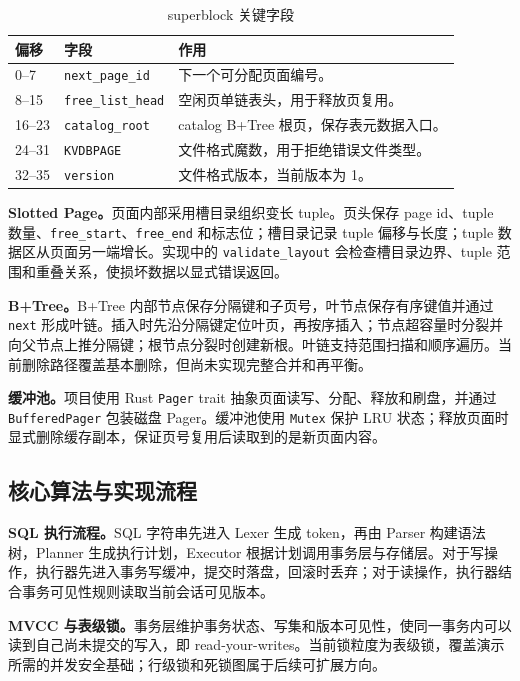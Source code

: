 \documentclass[UTF8,a4paper,12pt]{ctexart}
\newcommand{\code}[1]{\texttt{#1}}
\begin{document}
\begin{table}[H]
\centering
\caption{superblock 关键字段}
\begin{tabularx}{\textwidth}{p{2.5cm}p{3.4cm}X}
\toprule
偏移 & 字段 & 作用\\
\midrule
0--7 & \code{next\_page\_id} & 下一个可分配页面编号。\\
8--15 & \code{free\_list\_head} & 空闲页单链表头，用于释放页复用。\\
16--23 & \code{catalog\_root} & catalog B+Tree 根页，保存表元数据入口。\\
24--31 & \code{KVDBPAGE} & 文件格式魔数，用于拒绝错误文件类型。\\
32--35 & \code{version} & 文件格式版本，当前版本为 1。\\
\bottomrule
\end{tabularx}
\end{table}

\textbf{Slotted Page。}页面内部采用槽目录组织变长 tuple。页头保存 page id、tuple 数量、\code{free\_start}、\code{free\_end} 和标志位；槽目录记录 tuple 偏移与长度；tuple 数据区从页面另一端增长。实现中的 \code{validate\_layout} 会检查槽目录边界、tuple 范围和重叠关系，使损坏数据以显式错误返回。

\textbf{B+Tree。}B+Tree 内部节点保存分隔键和子页号，叶节点保存有序键值并通过 \code{next} 形成叶链。插入时先沿分隔键定位叶页，再按序插入；节点超容量时分裂并向父节点上推分隔键；根节点分裂时创建新根。叶链支持范围扫描和顺序遍历。当前删除路径覆盖基本删除，但尚未实现完整合并和再平衡。

\textbf{缓冲池。}项目使用 Rust \code{Pager} trait 抽象页面读写、分配、释放和刷盘，并通过 \code{BufferedPager} 包装磁盘 Pager。缓冲池使用 \code{Mutex} 保护 LRU 状态；释放页面时显式删除缓存副本，保证页号复用后读取到的是新页面内容。

\subsection{核心算法与实现流程}

\textbf{SQL 执行流程。}SQL 字符串先进入 Lexer 生成 token，再由 Parser 构建语法树，Planner 生成执行计划，Executor 根据计划调用事务层与存储层。对于写操作，执行器先进入事务写缓冲，提交时落盘，回滚时丢弃；对于读操作，执行器结合事务可见性规则读取当前会话可见版本。

\textbf{MVCC 与表级锁。}事务层维护事务状态、写集和版本可见性，使同一事务内可以读到自己尚未提交的写入，即 read-your-writes。当前锁粒度为表级锁，覆盖演示所需的并发安全基础；行级锁和死锁图属于后续可扩展方向。
\end{document}
